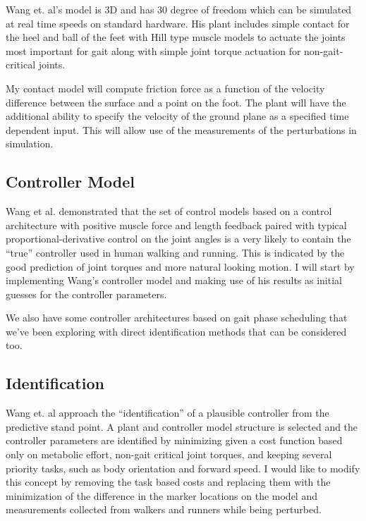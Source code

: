 \documentclass[11pt]{article}
\begin{document}
Wang et. al's model is 3D and has 30 degree of freedom which can be simulated
at real time speeds on standard hardware. His plant includes simple contact for
the heel and ball of the feet with Hill type muscle models to actuate the
joints most important for gait along with simple joint torque actuation for
non-gait-critical joints.

My contact model will compute friction force as a function of the velocity
difference between the surface and a point on the foot. The plant will have the
additional ability to specify the velocity of the ground plane as a specified
time dependent input. This will allow use of the measurements of the
perturbations in simulation.

\subsection*{Controller Model}

Wang et al. demonstrated that the set of control models based on a control
architecture with positive muscle force and length feedback paired with typical
proportional-derivative control on the joint angles is a very likely to contain
the ``true'' controller used in human walking and running. This is indicated by
the good prediction of joint torques and more natural looking motion. I will
start by implementing Wang's controller model and making use of his results as
initial guesses for the controller parameters.


We also have some controller architectures based on gait phase scheduling that
we've been exploring with direct identification methods that can be considered
too.

\subsection*{Identification}

Wang et. al  approach the ``identification'' of a plausible controller from the
predictive stand point. A plant and controller model structure is selected and
the controller parameters are identified by minimizing given a cost function
based only on metabolic effort, non-gait critical joint torques, and keeping
several priority tasks, such as body orientation and forward speed. I would
like to modify this concept by removing the task based costs and replacing them
with the minimization of the difference in the marker locations on the model
and measurements collected from walkers and runners while being perturbed.
\end{document}
